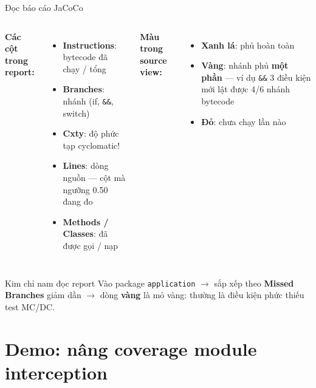 \documentclass[aspectratio=169,12pt]{beamer}
\begin{document}
\begin{frame}{Đọc báo cáo JaCoCo}
  \begin{columns}[T]
    \textbf{Các cột trong report:}
    \begin{itemize}
      \item \small \textbf{Instructions}: bytecode đã chạy / tổng
      \item \small \textbf{Branches}: nhánh (if, \texttt{\&\&}, switch)
      \item \small \textbf{Cxty}: độ phức tạp cyclomatic!
      \item \small \textbf{Lines}: dòng nguồn --- cột mà
            ngưỡng 0.50 đang đo
      \item \small \textbf{Methods / Classes}: đã được gọi / nạp
    \end{itemize}

    \textbf{Màu trong source view:}
    \begin{itemize}
      \item \small \textcolor{green!50!black}{\textbf{Xanh lá}}:
            phủ hoàn toàn
      \item \small \textcolor{orange!80!black}{\textbf{Vàng}}:
            nhánh phủ \textbf{một phần} --- ví dụ \texttt{\&\&} 3 điều kiện
            mới lật được 4/6 nhánh bytecode
      \item \small \textcolor{red!70!black}{\textbf{Đỏ}}: chưa chạy lần nào
    \end{itemize}
  \end{columns}

  \vspace{0.4em}
  \begin{exampleblock}{Kim chỉ nam đọc report}
    Vào package \texttt{application} $\to$ sắp xếp theo
    \textbf{Missed Branches} giảm dần $\to$ dòng \textbf{vàng} là mỏ vàng:
    thường là điều kiện phức thiếu test MC/DC.
  \end{exampleblock}
\end{frame}

\section{Demo: nâng coverage module interception}
\end{document}
